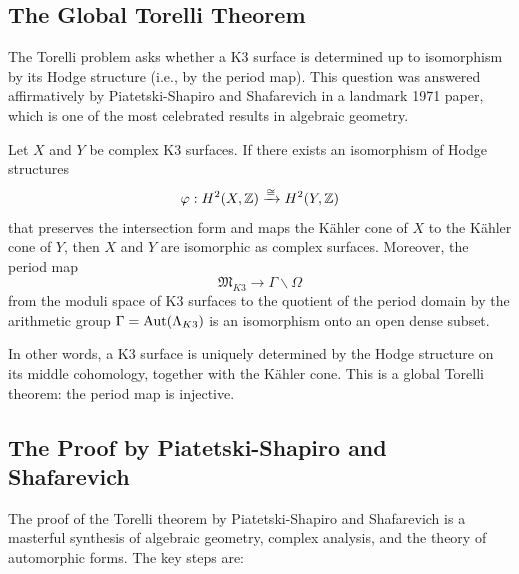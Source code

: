 \subsection{The Global Torelli Theorem}

The Torelli problem asks whether a K3 surface is determined up to isomorphism by its Hodge structure (i.e., by the period map). This question was answered affirmatively by Piatetski-Shapiro and Shafarevich in a landmark 1971 paper, which is one of the most celebrated results in algebraic geometry.

\begin{theorem}
Let \(X\) and \(Y\) be complex K3 surfaces. If there exists an isomorphism of Hodge structures
\[
\varphi: H^2(X,\mathbb{Z}) \xrightarrow{\cong} H^2(Y,\mathbb{Z})
\]
that preserves the intersection form and maps the K\"{a}hler cone of \(X\) to the K\"{a}hler cone of \(Y\), then \(X\) and \(Y\) are isomorphic as complex surfaces. Moreover, the period map
\[
\mathfrak{M}_{K3} \longrightarrow \Gamma \backslash \Omega
\]
from the moduli space of K3 surfaces to the quotient of the period domain by the arithmetic group \(\Gamma = \operatorname{Aut}(\Lambda_{K3})\) is an isomorphism onto an open dense subset.
\end{theorem}

In other words, a K3 surface is uniquely determined by the Hodge structure on its middle cohomology, together with the K\"{a}hler cone. This is a global Torelli theorem: the period map is injective.

\subsection{The Proof by Piatetski-Shapiro and Shafarevich}

The proof of the Torelli theorem by Piatetski-Shapiro and Shafarevich is a masterful synthesis of algebraic geometry, complex analysis, and the theory of automorphic forms. The key steps are:

